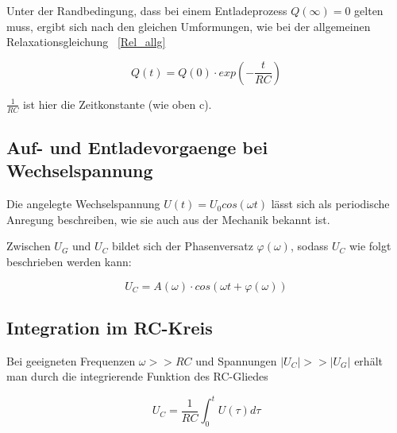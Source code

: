 Unter der Randbedingung, dass bei einem Entladeprozess $Q(\infty) = 0$ gelten muss, ergibt sich nach den gleichen
Umformungen, wie bei der allgemeinen Relaxationsgleichung ~\eqref{Rel_allg}

\begin{equation}
    \label{}
Q(t) = Q(0)\cdot exp(-\frac{t}{RC})
\end{equation}

$\frac{1}{RC}$ ist hier die Zeitkonstante (wie oben c).


\subsection{Auf- und Entladevorgaenge bei Wechselspannung}
\label{subsec:Entladevorgaenge bei Wechselspannung}

Die angelegte Wechselspannung $U(t) = U_0 cos(\omega t)$ lässt sich als periodische Anregung beschreiben, 
wie sie auch aus der Mechanik bekannt ist.

Zwischen $U_G$ und $U_C$ bildet sich der Phasenversatz $\varphi(\omega)$, sodass $U_C$ wie folgt beschrieben werden
kann:

\begin{equation}
    U_C = A(\omega) \cdot cos(\omega t + \varphi(\omega))
\end{equation}


\subsection{Integration im RC-Kreis}
\label{subsec:Integration im RC-Kreis}

Bei geeigneten Frequenzen $\omega >> RC$ und Spannungen $|U_C| >> |U_G|$ erhält man durch die integrierende Funktion des RC-Gliedes 

\begin{equation}
    \label{integrator}
    U_C = \frac{1}{RC} \int_{0}^{t} U(\tau) d\tau
\end{equation}


\cite{sample}

